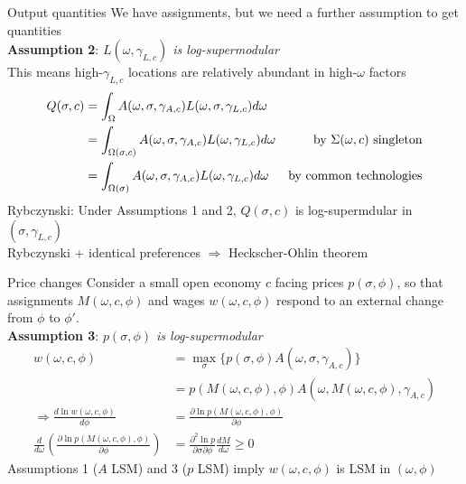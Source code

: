 \documentclass[10pt,notes=hide]{beamer}
\begin{document}
\begin{frame}{Output quantities}
We have assignments, but we need a further assumption to get quantities\\
\textbf{Assumption 2}: 
\textit{$L(\omega,\gamma_{L,c})$ is log-supermodular}\\
This means high-$\gamma_{L,c}$ locations are relatively abundant in high-$\omega$ factors
\begin{align*}
Q(\sigma,c) & = \int_{\Omega} A(\omega,\sigma,\gamma_{A,c})L(\omega,\sigma,\gamma_{L,c})d\omega \\
 & = \int_{\Omega(\sigma,c)} A(\omega,\sigma,\gamma_{A,c})L(\omega,\gamma_{L,c})d\omega &\textnormal{by $\Sigma(\omega,c)$ singleton}\\
 & = \int_{\Omega(\sigma)} A(\omega,\sigma,\gamma_{A,c})L(\omega,\gamma_{L,c})d\omega & \textnormal{by common technologies} 
\end{align*}
Rybczynski: Under Assumptions 1 and 2, $Q(\sigma,c)$ is log-supermdular in $(\sigma,\gamma_{L,c})$ \\
Rybczynski + identical preferences $\Rightarrow$ Heckscher-Ohlin theorem
\end{frame}
\begin{frame}{Price changes}
Consider a small open economy $c$ facing prices $p(\sigma,\phi)$, so that assignments $M(\omega,c,\phi)$ and wages $w(\omega,c,\phi)$ respond to an external change from $\phi$ to $\phi'$.
\\ \textbf{Assumption 3}: \textit{$p(\sigma,\phi)$ is log-supermodular}
\begin{align*}
w(\omega,c,\phi) &= \max_{\sigma} \{p(\sigma,\phi)A(\omega,\sigma,\gamma_{A,c})\}\\
&= p(M(\omega,c,\phi),\phi)A(\omega,M(\omega,c,\phi),\gamma_{A,c}) \\
\Rightarrow \frac{d \ln w(\omega,c,\phi)}{d\phi} &= \frac{\partial \ln p(M(\omega,c,\phi),\phi)}{\partial \phi} \\
\frac{d}{d\omega} \left( \frac{\partial \ln p(M(\omega,c,\phi),\phi)}{\partial \phi} \right) &= \frac{\partial^2 \ln p}{\partial \sigma\partial\phi} \frac{dM}{d\omega} \geq 0
\end{align*}
Assumptions 1 ($A$ LSM) and 3 ($p$ LSM) imply $w(\omega,c,\phi)$ is LSM in $(\omega,\phi)$
\end{frame}
\end{document}
